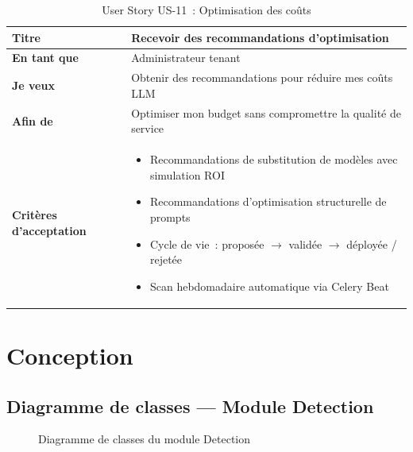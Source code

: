 \begin{table}[H]
\centering
\caption{User Story US-11~: Optimisation des coûts}
\label{tab:us11}
\begin{tabularx}{\textwidth}{|l|X|}
\hline
\textbf{Titre} & Recevoir des recommandations d'optimisation \\
\hline
\textbf{En tant que} & Administrateur tenant \\
\hline
\textbf{Je veux} & Obtenir des recommandations pour réduire mes coûts LLM \\
\hline
\textbf{Afin de} & Optimiser mon budget sans compromettre la qualité de service \\
\hline
\textbf{Critères d'acceptation} & \begin{minipage}[t]{\linewidth}\vspace{2pt}
\begin{itemize}[noitemsep,topsep=0pt]
\item Recommandations de substitution de modèles avec simulation ROI
\item Recommandations d'optimisation structurelle de prompts
\item Cycle de vie~: proposée $\rightarrow$ validée $\rightarrow$ déployée / rejetée
\item Scan hebdomadaire automatique via Celery Beat
\end{itemize}\vspace{2pt}
\end{minipage} \\
\hline
\end{tabularx}
\end{table}


\section{Conception}
\label{sec:s2_conception}

\subsection{Diagramme de classes --- Module Detection}

\begin{figure}[H]
    \centering
    \caption{Diagramme de classes du module Detection}
    \label{fig:class_detection}
\end{figure}

